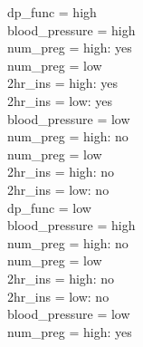 \documentclass[12pt]{article}
\begin{document}
\textbar\quad \textbar\quad \textbar\quad \textbar\quad dp\_func = high\\
\textbar\quad \textbar\quad \textbar\quad \textbar\quad \textbar\quad blood\_pressure = high\\
\textbar\quad \textbar\quad \textbar\quad \textbar\quad \textbar\quad \textbar\quad num\_preg = high: yes\\
\textbar\quad \textbar\quad \textbar\quad \textbar\quad \textbar\quad \textbar\quad num\_preg = low\\
\textbar\quad \textbar\quad \textbar\quad \textbar\quad \textbar\quad \textbar\quad \textbar\quad 2hr\_ins = high: yes\\
\textbar\quad \textbar\quad \textbar\quad \textbar\quad \textbar\quad \textbar\quad \textbar\quad 2hr\_ins = low: yes\\
\textbar\quad \textbar\quad \textbar\quad \textbar\quad \textbar\quad blood\_pressure = low\\
\textbar\quad \textbar\quad \textbar\quad \textbar\quad \textbar\quad \textbar\quad num\_preg = high: no\\
\textbar\quad \textbar\quad \textbar\quad \textbar\quad \textbar\quad \textbar\quad num\_preg = low\\
\textbar\quad \textbar\quad \textbar\quad \textbar\quad \textbar\quad \textbar\quad \textbar\quad 2hr\_ins = high: no\\
\textbar\quad \textbar\quad \textbar\quad \textbar\quad \textbar\quad \textbar\quad \textbar\quad 2hr\_ins = low: no\\
\textbar\quad \textbar\quad \textbar\quad \textbar\quad dp\_func = low\\
\textbar\quad \textbar\quad \textbar\quad \textbar\quad \textbar\quad blood\_pressure = high\\
\textbar\quad \textbar\quad \textbar\quad \textbar\quad \textbar\quad \textbar\quad num\_preg = high: no\\
\textbar\quad \textbar\quad \textbar\quad \textbar\quad \textbar\quad \textbar\quad num\_preg = low\\
\textbar\quad \textbar\quad \textbar\quad \textbar\quad \textbar\quad \textbar\quad \textbar\quad 2hr\_ins = high: no\\
\textbar\quad \textbar\quad \textbar\quad \textbar\quad \textbar\quad \textbar\quad \textbar\quad 2hr\_ins = low: no\\
\textbar\quad \textbar\quad \textbar\quad \textbar\quad \textbar\quad blood\_pressure = low\\
\textbar\quad \textbar\quad \textbar\quad \textbar\quad \textbar\quad \textbar\quad num\_preg = high: yes\\
\end{document}
